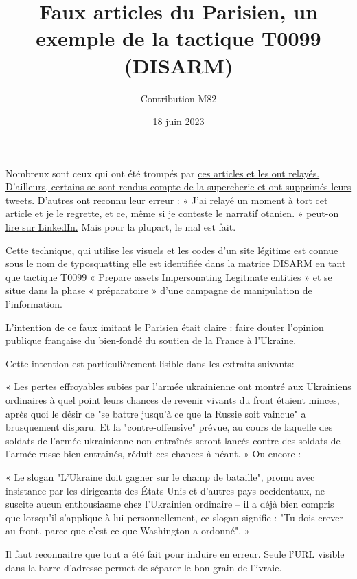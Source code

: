 \documentclass[a4paper]{article}
\title{Faux articles du Parisien, un exemple de la tactique T0099 (DISARM)}
\author{Contribution M82} %
\date{18 juin 2023}
\begin{document}
\maketitle                 

Nombreux sont ceux qui ont été trompés par \href{https://twitter.com/search?q=Un\%20exode\%20massif\%20pour\%20\%C3\%A9chapper\%20\%C3\%A0\%20l\%27esclavage\%20militaire&src=typed_query}{ces articles et les ont relayés. D’ailleurs, certains se sont rendus compte de la supercherie et ont supprimés leurs tweets. D’autres ont reconnu leur erreur : « J'ai relayé un moment à tort cet article et je le regrette, et ce, même si je conteste le narratif otanien. » peut-on lire sur LinkedIn.}
 Mais pour la plupart, le mal est fait. 


Cette technique, qui utilise les visuels et les codes d’un site légitime est connue sous le nom de typosquatting elle est identifiée dans la matrice DISARM en tant que tactique T0099 « Prepare assets Impersonating Legitmate entities » et se situe dans la phase « préparatoire » d’une campagne de manipulation de l’information.


L'intention de ce faux imitant le Parisien était claire : faire douter l'opinion publique française du bien-fondé du soutien de la France à l'Ukraine.

Cette intention est particulièrement lisible dans les extraits suivants:


« Les pertes effroyables subies par l'armée ukrainienne ont montré aux Ukrainiens ordinaires à quel point leurs chances de revenir vivants du front étaient minces, après quoi le désir de "se battre jusqu'à ce que la Russie soit vaincue" a brusquement disparu. Et la "contre-offensive" prévue, au cours de laquelle des soldats de l'armée ukrainienne non entraînés seront lancés contre des soldats de l'armée russe bien entraînés, réduit ces chances à néant. »
 Ou encore :

« Le slogan "L'Ukraine doit gagner sur le champ de bataille", promu avec insistance par les dirigeants des États-Unis et d'autres pays occidentaux, ne suscite aucun enthousiasme chez l'Ukrainien ordinaire – il a déjà bien compris que lorsqu'il s'applique à lui personnellement, ce slogan signifie : "Tu dois crever au front, parce que c'est ce que Washington a ordonné". »

 Il faut reconnaitre que tout a été fait pour induire en erreur. Seule l'URL visible dans la barre d'adresse permet de séparer le bon grain de l'ivraie. 
\end{document}
